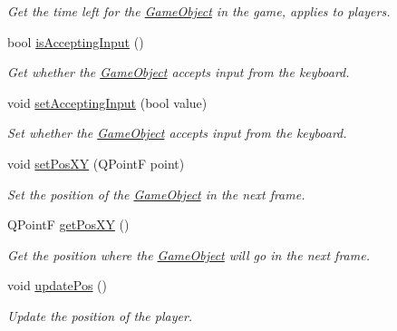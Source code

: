 \begin{DoxyCompactItemize}
\begin{DoxyCompactList}\small\item\em Get the time left for the \hyperlink{classGameObject}{Game\-Object} in the game, applies to players. \end{DoxyCompactList}\item 
bool \hyperlink{classGameObject_a6fc32284114a6d3b45c3d0485c688146}{is\-Accepting\-Input} ()
\begin{DoxyCompactList}\small\item\em Get whether the \hyperlink{classGameObject}{Game\-Object} accepts input from the keyboard. \end{DoxyCompactList}\item 
void \hyperlink{classGameObject_a9271d8661100d433a104601cd0d0d891}{set\-Accepting\-Input} (bool value)
\begin{DoxyCompactList}\small\item\em Set whether the \hyperlink{classGameObject}{Game\-Object} accepts input from the keyboard. \end{DoxyCompactList}\item 
void \hyperlink{classGameObject_ab10b02b28281e7398cd9f05bb7bea9c3}{set\-Pos\-X\-Y} (Q\-Point\-F point)
\begin{DoxyCompactList}\small\item\em Set the position of the \hyperlink{classGameObject}{Game\-Object} in the next frame. \end{DoxyCompactList}\item 
Q\-Point\-F \hyperlink{classGameObject_ae4529f9eeec4153ee11ff685d5c4443b}{get\-Pos\-X\-Y} ()
\begin{DoxyCompactList}\small\item\em Get the position where the \hyperlink{classGameObject}{Game\-Object} will go in the next frame. \end{DoxyCompactList}\item 
\hypertarget{classGameObject_a13fe91332392ef175ed61e57e9414111}{void \hyperlink{classGameObject_a13fe91332392ef175ed61e57e9414111}{update\-Pos} ()}\label{classGameObject_a13fe91332392ef175ed61e57e9414111}

\begin{DoxyCompactList}\small\item\em Update the position of the player. \end{DoxyCompactList}\end{DoxyCompactItemize}
